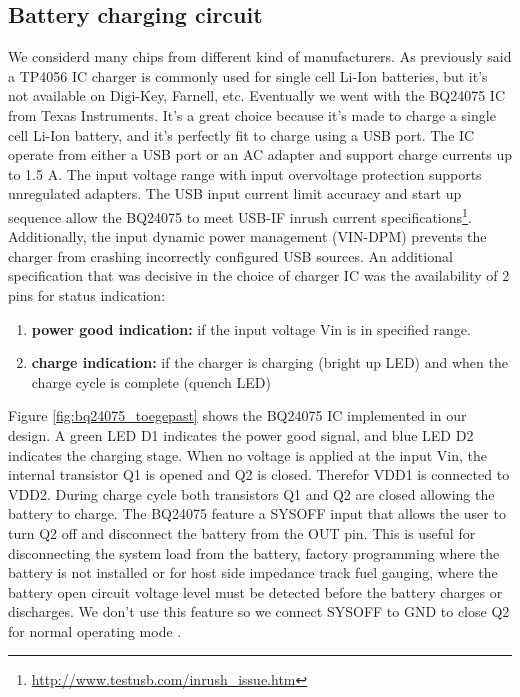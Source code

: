 \documentclass[11pt,a4paper]{article}
\begin{document}
\subsection{Battery charging circuit}
We considerd many chips from different kind of manufacturers. As previously said a TP4056 IC charger is commonly used for single cell Li-Ion batteries, but it's not available on Digi-Key, Farnell, etc. Eventually we went with the BQ24075 IC from Texas Instruments. It's a great choice because it's made to charge a single cell Li-Ion battery, and it's perfectly fit to charge using a USB port. The IC operate from either a USB port or an AC adapter and support charge currents up to 1.5 A. The input voltage range with input overvoltage protection supports unregulated adapters. The USB input current limit accuracy and start up sequence allow the BQ24075 to meet USB-IF inrush current specifications\footnote{\url{http://www.testusb.com/inrush_issue.htm}}. Additionally, the input dynamic power management (VIN-DPM) prevents the charger from crashing incorrectly configured USB sources. An additional specification that was decisive in the choice of charger IC was the availability of 2 pins for status indication:
\begin{enumerate}
	\item \textbf{power good indication:} if the input voltage Vin is in specified range.
	\item \textbf{charge indication:} if the charger is charging (bright up LED) and when the charge cycle is complete (quench LED)
\end{enumerate}
Figure \ref{fig:bq24075_toegepast} shows the BQ24075 IC implemented in our design. A green LED D1 indicates the power good signal, and blue LED D2 indicates the charging stage. When no voltage is applied at the input Vin, the internal transistor Q1 is opened and Q2 is closed. Therefor VDD1 is connected to VDD2. During charge cycle both transistors Q1 and Q2 are closed allowing the battery to charge. The BQ24075 feature a SYSOFF input that allows the user to turn Q2 off and disconnect the battery from the OUT pin. This is useful for disconnecting the system load from the battery, factory programming where the battery is not installed or for host side impedance track fuel gauging, where the battery open circuit voltage level must be detected before the battery charges or discharges. We don't use this feature so we connect SYSOFF to GND to close Q2 for normal operating mode \cite{bib:BQ24075}. %
\end{document}
